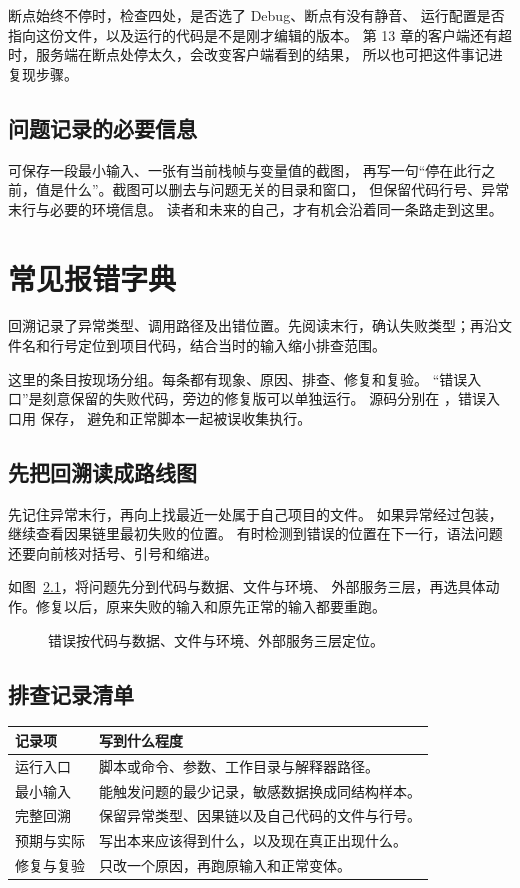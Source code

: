 断点始终不停时，检查四处，是否选了 Debug、断点有没有静音、
运行配置是否指向这份文件，以及运行的代码是不是刚才编辑的版本。
第 13 章的客户端还有超时，服务端在断点处停太久，会改变客户端看到的结果，
所以也可把这件事记进复现步骤。

\section{问题记录的必要信息}

可保存一段最小输入、一张有当前栈帧与变量值的截图，
再写一句“停在此行之前，值是什么”。截图可以删去与问题无关的目录和窗口，
但保留代码行号、异常末行与必要的环境信息。
读者和未来的自己，才有机会沿着同一条路走到这里。


\chapter{常见报错字典}

回溯记录了异常类型、调用路径及出错位置。先阅读末行，确认失败类型；再沿文件名和行号定位到项目代码，结合当时的输入缩小排查范围。

这里的条目按现场分组。每条都有现象、原因、排查、修复和复验。
“错误入口”是刻意保留的失败代码，旁边的修复版可以单独运行。
源码分别在 ，错误入口用  保存，
避免和正常脚本一起被误收集执行。

\section{先把回溯读成路线图}

先记住异常末行，再向上找最近一处属于自己项目的文件。
如果异常经过包装，继续查看因果链里最初失败的位置。
有时检测到错误的位置在下一行，语法问题还要向前核对括号、引号和缩进。

如图~\ref{fig:appendix-diagnosis}，将问题先分到代码与数据、文件与环境、
外部服务三层，再选具体动作。修复以后，原来失败的输入和原先正常的输入都要重跑。
\begin{figure}[htbp]
\centering
{}
\caption{错误按代码与数据、文件与环境、外部服务三层定位。}
\label{fig:appendix-diagnosis}
\end{figure}

\section*{排查记录清单}

\begin{tabularx}{\textwidth}{@{}p{}X@{}}
\toprule
\textbf{记录项} & \textbf{写到什么程度}\\
\midrule
运行入口 & 脚本或命令、参数、工作目录与解释器路径。\\
最小输入 & 能触发问题的最少记录，敏感数据换成同结构样本。\\
完整回溯 & 保留异常类型、因果链以及自己代码的文件与行号。\\
预期与实际 & 写出本来应该得到什么，以及现在真正出现什么。\\
修复与复验 & 只改一个原因，再跑原输入和正常变体。\\
\bottomrule
\end{tabularx}\par

